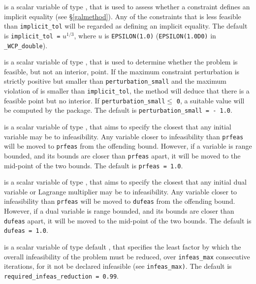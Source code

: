 \documentclass{galahad}
\newcommand{\packagename}{WCP}
\newcommand{\fullpackagename}{\libraryname\_\-\packagename}
\begin{document}
\begin{description}
 is a scalar variable of type \realdp, 
that is used to assess whether a constraint defines an implicit equality
(see \S\ref{galmethod}). Any of the constraints 
that is less feasible than {\tt implicit\_tol} will be regarded as defining 
an implicit equality.
The default is {\tt implicit\_tol =} $u^{1/3}$,
where $u$ is {\tt EPSILON(1.0)} ({\tt EPSILON(1.0D0)} in 
{\tt \fullpackagename\_double}).

 is a scalar variable of type \realdp, 
that is used to determine whether the problem is feasible, but not
an interior, point. If the maximum constraint perturbation is strictly 
positive but smaller than {\tt perturbation\_small} and the maximum violation 
of  is smaller than {\tt implicit\_tol}, the 
method will deduce that there is a feasible point but no interior.
If {\tt perturbation\_sm\-all}$\leq$ {\tt 0}, a suitable value will be
computed by the package. The default is {\tt perturbation\_sm\-all = - 1.0}.

 is a scalar variable of type \realdp, that aims to specify
the closest that any initial variable may be to infeasibility. Any variable
closer to infeasibility than {\tt prfeas} will be moved to {\tt prfeas} from 
the offending bound. However, if a variable is range bounded, and its bounds 
are closer than {\tt prfeas} apart, it will be moved to the mid-point of the 
two bounds.
The default is {\tt prfeas = 1.0}.

 is a scalar variable of type \realdp, that aims to specify
the closest that any initial dual variable or Lagrange multiplier may be to 
infeasibility. Any variable closer to infeasibility than {\tt prfeas} will be
moved to {\tt dufeas} from the offending bound. However, if a dual variable
is range bounded, and its bounds are closer than {\tt dufeas} apart, it will
be moved to the mid-point of the two bounds.
The default is {\tt dufeas = 1.0}.

  is a scalar variable of type default 
\realdp, that specifies the
least factor by which the overall infeasibility of the problem must be reduced,
over {\tt infeas\_max} consecutive iterations, 
for it not be declared infeasible (see {\tt infeas\_max)}.
The default is {\tt required\_infeas\_re\-duction = 0.99}.



\end{description}
\end{document}
